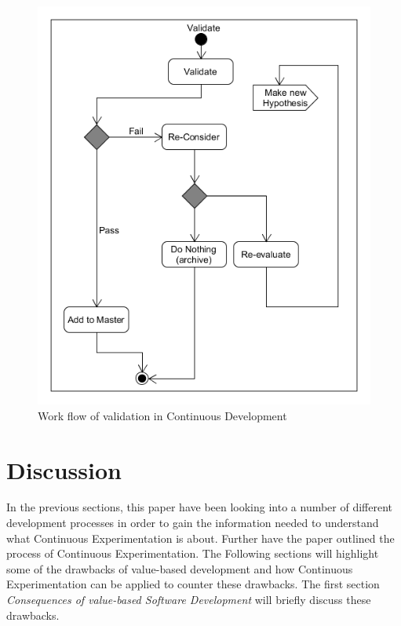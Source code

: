\documentclass{sig-alternate}
\begin{document}
\begin{figure}
\centering
\includegraphics[scale=0.4]{Umlet/ValidateActivity}
\caption{Work flow of validation in Continuous Development}
\label{fig:validation}
\end{figure}

\section{Discussion}
In the previous sections, this paper have been looking into a number of different development processes in order to gain the information needed to understand what Continuous Experimentation is about. Further have the paper outlined the process of Continuous Experimentation. The Following sections will highlight some of the drawbacks of value-based development and how Continuous Experimentation can be applied to counter these drawbacks. The first section \textit{Consequences of value-based Software Development} will briefly discuss these drawbacks. 
\end{document}
